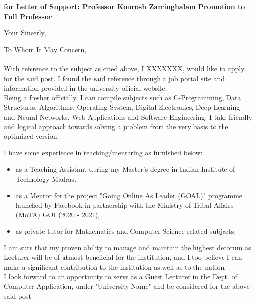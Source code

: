 \documentclass[11pt,a4paper,roman]{moderncv}
\begin{document}
\date{\today}
\opening{\textbf{for Letter of Support: Professor Kourosh Zarringhalam Promotion to Full Professor}}
\closing{Your Sincerly, \vspace{-1em}}


\makelettertitle



To Whom It May Concern,\\
\\
\vspace{1em}
With reference to the subject as cited above, I XXXXXXX, would like to apply for the said post. I found the said reference through a job portal site and information provided in the university official website.\\

\vspace{1em}
Being a fresher officially, I can compile subjects such as C-Programming, Data Structures, Algorithms, Operating System, Digital Electronics, Deep Learning and Neural Networks, Web Applications and Software Engineering. I take friendly and logical approach towards solving a problem from the very basis to the optimized version.  \\
\vspace{1em}

I have some experience in teaching/mentoring  as furnished below:
\vspace{0.5em}
\begin{itemize}
\item as a Teaching Assistant during my Master's degree in Indian Institute of Technology Madras,
\item as a Mentor for the project "Going Online As Leader (GOAL)" programme launched by Facebook in partnership with the Ministry of Tribal Affairs (MoTA) GOI (2020 - 2021),
\item as private tutor for Mathematics and Computer Science related subjects.
\end{itemize}

\vspace{1em}
I am sure that my proven ability to manage and maintain the highest decorum as Lecturer will be of utmost beneficial for the institution, and I too believe I can make a significant contribution to the institution as well as to the nation. \\

\vspace{1em}
I look forward to an opportunity to serve as a Guest Lecturer in the Dept. of Computer Application, under "University Name" and be considered for the above-said post.

\vspace{0.5cm}


\makeletterclosing
\end{document}
